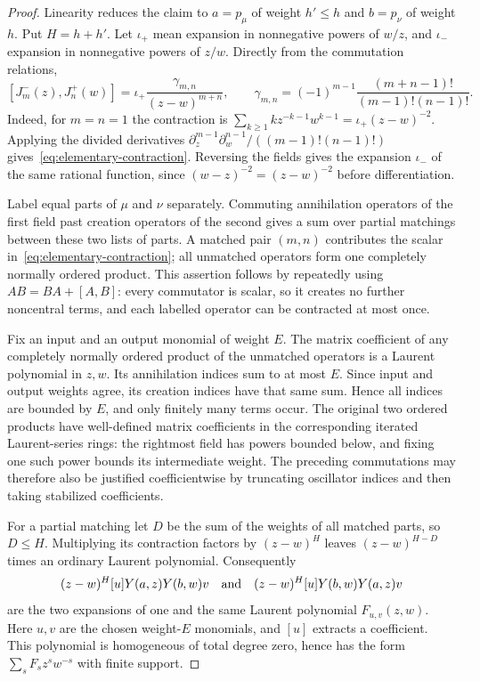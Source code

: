 \begin{proof}
Linearity reduces the claim to $a=p_\mu$ of weight $h'\le h$
and $b=p_\nu$ of weight $h$. Put $H=h+h'$. Let $\iota_+$
mean expansion in nonnegative powers of $w/z$, and $\iota_-$
expansion in nonnegative powers of $z/w$. Directly from the
commutation relations,
\begin{equation}
\label{eq:elementary-contraction}
 [J_m^-(z),J_n^+(w)]
 =\iota_+\frac{\gamma_{m,n}}{(z-w)^{m+n}},\qquad
 \gamma_{m,n}=(-1)^{m-1}
       \frac{(m+n-1)!}{(m-1)!(n-1)!}.
\end{equation}
Indeed, for $m=n=1$ the contraction is
$\sum_{k\ge1}kz^{-k-1}w^{k-1}=\iota_+(z-w)^{-2}$.
Applying the divided derivatives
$\partial_z^{m-1}\partial_w^{n-1}/((m-1)!(n-1)!)$
gives~\eqref{eq:elementary-contraction}. Reversing the fields gives
the expansion $\iota_-$ of the same rational function, since
$(w-z)^{-2}=(z-w)^{-2}$ before differentiation.

Label equal parts of $\mu$ and $\nu$ separately. Commuting
annihilation operators of the first field past creation operators
of the second gives a sum over partial matchings between these two
lists of parts. A matched pair $(m,n)$ contributes the scalar
in~\eqref{eq:elementary-contraction}; all unmatched operators form
one completely normally ordered product. This assertion follows by
repeatedly using $AB=BA+[A,B]$: every commutator is scalar, so it
creates no further noncentral terms, and each labelled operator can
be contracted at most once.

Fix an input and an output monomial of weight $E$. The matrix
coefficient of any completely normally ordered product of the
unmatched operators is a Laurent polynomial in $z,w$. Its
annihilation indices sum to at most $E$. Since input and output
weights agree, its creation indices have that same sum. Hence all
indices are bounded by $E$, and only finitely many terms occur.
The original two ordered products have well-defined matrix
coefficients in the corresponding iterated Laurent-series rings:
the rightmost field has powers bounded below, and fixing one such
power bounds its intermediate weight. The preceding commutations
may therefore also be justified coefficientwise by truncating
oscillator indices and then taking stabilized coefficients.

For a partial matching let $D$ be the sum of the weights of all
matched parts, so $D\le H$. Multiplying its contraction factors
by $(z-w)^H$ leaves $(z-w)^{H-D}$ times an ordinary Laurent
polynomial. Consequently
\[
 (z-w)^H [u]Y(a,z)Y(b,w)v
 \quad\hbox{and}\quad
 (z-w)^H [u]Y(b,w)Y(a,z)v
\]
are the two expansions of one and the same Laurent polynomial
$F_{u,v}(z,w)$. Here $u,v$ are the chosen weight-$E$ monomials,
and $[u]$ extracts a coefficient. This polynomial is homogeneous
of total degree zero, hence has the form
$\sum_s F_s z^s w^{-s}$ with finite support.


\end{proof}
